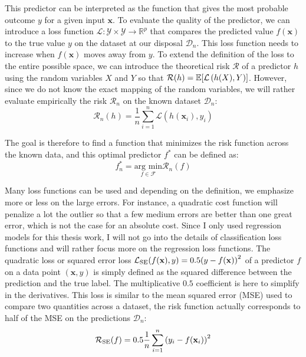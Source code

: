 \documentclass[main]{subfiles}
\begin{document}
This predictor can be interpreted as the function that gives the most probable outcome $y$ for a given input $\mathbf{x}$. To evaluate the quality of the predictor, we can introduce a loss function $\mathcal{L}:\mathcal{Y}\times\mathcal{Y} \rightarrow \mathbb{R}^{p}$ that compares the predicted value $f(\mathbf{x})$ to the true value $y$ on the dataset at our disposal $\mathcal{D}_{n}$. This loss function needs to increase when $f(\mathbf{x})$ moves away from $y$. To extend the definition of the loss to the entire possible space, we can introduce the theoretical risk $\mathcal{R}$ of a predictor $h$ using the random variables $X$ and $Y$ so that $\mathcal{R}(h) = \mathbb{E}{\left[\mathcal{L}\left(h(X),Y\right)\right]}$. However, since we do not know the exact mapping of the random variables, we will rather evaluate empirically the risk $\mathcal{R}_n$ on the known dataset $\mathcal{D}_{n}$:
\begin{equation}\label{eq:risk}
  \mathcal{R}_n(h) = \frac{1}{n}\sum_{i=1}^n \mathcal{L}\left(h(\mathbf{x}_i),y_i\right)
\end{equation}

The goal is therefore to find a function that minimizes the risk function across the known data, and this optimal predictor $f^*$ can be defined as:
\begin{equation}\label{eq:min_f}
  f_n^* = \underset{f\in\mathcal{F}}{\text{arg min}} \mathcal{R}_n(f)
\end{equation}


Many loss functions can be used and depending on the definition, we emphasize more or less on the large errors. For instance, a quadratic cost function will penalize a lot the outlier so that a few medium errors are better than one great error, which is not the case for an absolute cost. Since I only used regression models for this thesis work, I will not go into the details of classification loss functions and will rather focus more on the regression loss functions. The quadratic loss or squared error loss $\mathcal{L}_{\text{SE}}(f(\mathbf{x}),y)=0.5{\left(y-f(\mathbf{x})\right)}^2$ of a predictor $f$ on a data point $(\mathbf{x},y)$ is simply defined as the squared difference between the prediction and the true label. The multiplicative $0.5$ coefficient is here to simplify in the derivatives. This loss is similar to the mean squared error (MSE) used to compare two quantities across a dataset, the risk function actually corresponds to half of the MSE on the predictions $\mathcal{D}_n$:
\begin{equation}
  \mathcal{R}_{\text{SE}}(f) = 0.5\frac{1}{n}\sum_{i=1}^n {\left(y_i-f(\mathbf{x}_i)\right)}^2
\end{equation}
\end{document}
